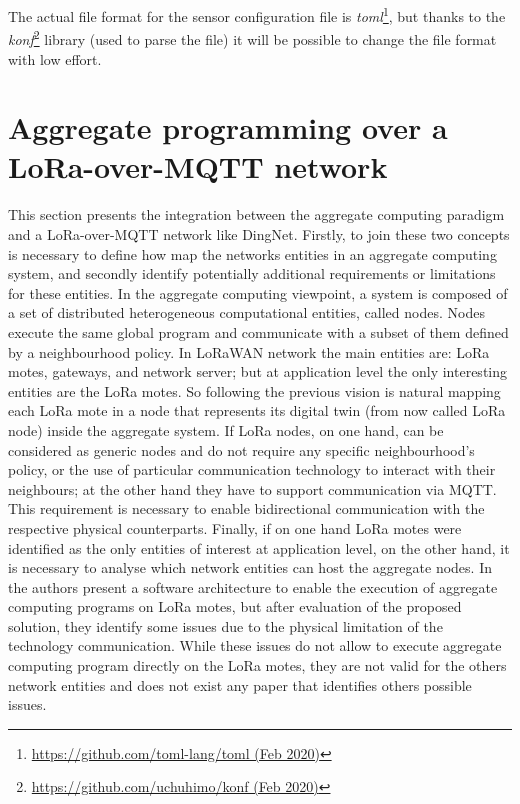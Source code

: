 % 
The actual file format for the sensor configuration file is \textit{toml}\footnote{\href{https://github.com/toml-lang/toml}{https://github.com/toml-lang/toml (Feb 2020)}}, but thanks to the \textit{konf}\footnote{\href{https://github.com/uchuhimo/konf}{https://github.com/uchuhimo/konf (Feb 2020)}} library (used to parse the file) it will be possible to change the file format with low effort.



\section{Aggregate programming over a LoRa-over-MQTT network}
\label{sec:contributionACOverDingNet}
This section presents the integration between the aggregate computing paradigm and a LoRa-over-MQTT network like DingNet.
Firstly, to join these two concepts is necessary to define how map the networks entities in an aggregate computing system, and secondly identify potentially additional requirements or limitations for these entities.
In the aggregate computing viewpoint, a system is composed of a set of distributed heterogeneous computational entities, called nodes. Nodes execute the same global program and communicate with a subset of them defined by a neighbourhood policy. 
In LoRaWAN network the main entities are: LoRa motes, gateways, and network server; but at application level the only interesting entities are the LoRa motes.
So following the previous vision is natural mapping each LoRa mote in a node that represents its digital twin (from now called LoRa node) inside the aggregate system.
If LoRa nodes, on one hand, can be considered as generic nodes and do not require any specific neighbourhood's policy, or the use of particular communication technology to interact with their neighbours; at the other hand they have to support communication via MQTT. 
This requirement is necessary to enable bidirectional communication with the respective physical counterparts.
Finally, if on one hand LoRa motes were identified as the only entities of interest at application level, on the other hand, it is necessary to analyse which network entities can host the aggregate nodes. 
In \cite{CCNCPS2018} the authors present a software architecture to enable the execution of aggregate computing programs on LoRa motes, but after evaluation of the proposed solution, they identify some issues due to the physical limitation of the technology communication. 
While these issues do not allow to execute aggregate computing program directly on the LoRa motes, they are not valid for the others network entities and does not exist any paper that identifies others possible issues.
